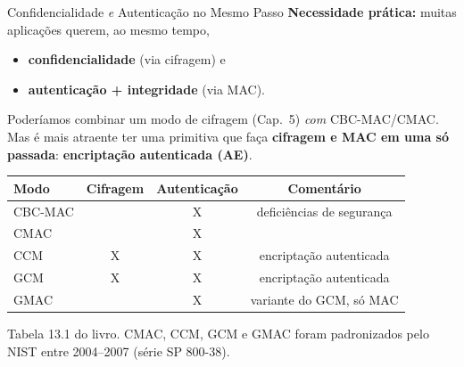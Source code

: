 \documentclass{beamer}
\begin{document}
\begin{frame}{Confidencialidade \emph{e} Autenticação no Mesmo Passo}
    \textbf{Necessidade prática:} muitas aplicações querem, ao mesmo tempo,
    \begin{itemize}
        \footnotesize
        \item \textbf{confidencialidade} (via cifragem) e
        \item \textbf{autenticação + integridade} (via MAC).
    \end{itemize}
    \medskip
    Poderíamos combinar um modo de cifragem (Cap.~5) \emph{com} CBC-MAC/CMAC. Mas é mais atraente ter uma primitiva que faça \textbf{cifragem e MAC em uma só passada}: \textbf{encriptação autenticada (AE)}.
    \medskip
    \begin{center}
        \small
        \begin{tabular}{lccc}
            \toprule
            \textbf{Modo} & \textbf{Cifragem} & \textbf{Autenticação} & \textbf{Comentário} \\
            \midrule
            CBC-MAC &            & X & deficiências de segurança \\
            CMAC    &            & X & \\
            \rowcolor{blue!8} CCM     & X & X & encriptação autenticada \\
            \rowcolor{blue!8} GCM     & X & X & encriptação autenticada \\
            GMAC    &            & X & variante do GCM, só MAC \\
            \bottomrule
        \end{tabular}
    \end{center}
    \smallskip
    {\footnotesize Tabela 13.1 do livro. CMAC, CCM, GCM e GMAC foram padronizados pelo NIST entre 2004--2007 (série SP 800-38).}
\end{frame}
\end{document}
